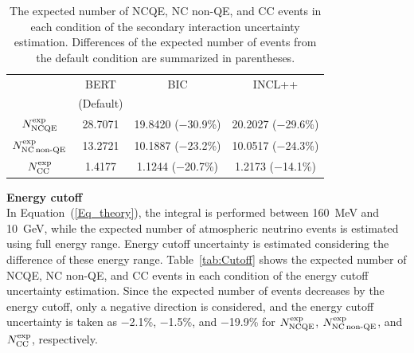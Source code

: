 \begin{table}[tbp]
	\centering
	\caption[The expected number of NCQE, NC non-QE, and CC events in each condition of the secondary interaction uncertainty estimation]{
	The expected number of NCQE, NC non-QE, and CC events in each condition of the secondary interaction uncertainty estimation.
	Differences of the expected number of events from the default condition are summarized in parentheses.
	}\label{tab:Sec}
	\vs
	\begin{tabular}{cccc} \hline \hline
		                                         & BERT      & BIC                 & INCL++              \\
		                                         & (Default) &                     &                     \\ \hline
		$N^{\rm exp}_{\rm NCQE}$                 & 28.7071   & 19.8420 ($-$30.9\%) & 20.2027 ($-$29.6\%) \\
		$N^{\rm exp}_{\rm NC\,non\mathchar`-QE}$ & 13.2721   & 10.1887 ($-$23.2\%) & 10.0517 ($-$24.3\%) \\
		$N^{\rm exp}_{\rm CC}$                   & 1.4177    & 1.1244 ($-$20.7\%)  & 1.2173 ($-$14.1\%)  \\ \hline \hline
	\end{tabular}
\end{table}

\textbf{Energy cutoff}\\
\hs
In Equation~(\ref{Eq_theory}), the integral is performed between 160~MeV and 10~GeV, while the expected number of atmospheric neutrino events is estimated using full energy range.
Energy cutoff uncertainty is estimated considering the difference of these energy range.
Table~\ref{tab:Cutoff} shows the expected number of NCQE, NC non-QE, and CC events in each condition of the energy cutoff uncertainty estimation.
Since the expected number of events decreases by the energy cutoff, only a negative direction is considered, and the energy cutoff uncertainty is taken as $-$2.1\%, $-$1.5\%, and $-$19.9\% for $N^{\rm exp}_{\rm NCQE}$, $N^{\rm exp}_{\rm NC\,non\mathchar`-QE}$, and $N^{\rm exp}_{\rm CC}$, respectively.\\

